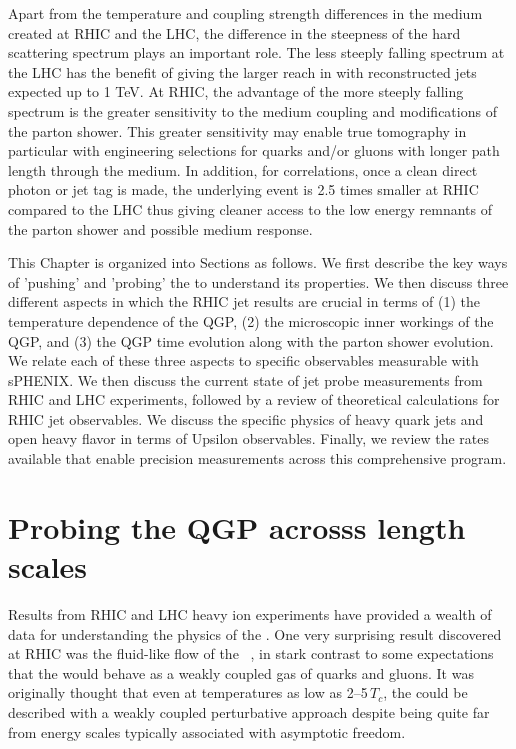 Apart from the temperature and coupling strength differences in the medium created
at RHIC and the LHC, the difference in the steepness of the hard scattering \pt spectrum
plays an important role.   The less steeply falling spectrum at the LHC has the benefit
of giving the larger reach in \pt with reconstructed jets expected up to 1 TeV.   At RHIC,
the advantage of the more steeply falling spectrum is the greater sensitivity to the medium
coupling and \qgp modifications of the parton shower.   This greater sensitivity may enable
true tomography in particular with engineering selections for quarks and/or gluons with longer
path length through the medium.   In addition, for correlations, once a clean direct photon or jet
tag is made, the underlying event is 2.5 times smaller at RHIC compared to the LHC thus giving
cleaner access to the low energy remnants of the parton shower and possible medium response.

This Chapter is organized into Sections as follows.  We first describe
the key ways of 'pushing' and 'probing' the \qgp to understand its
properties.  We then discuss three different aspects in which the RHIC
jet results are crucial in terms of (1) the temperature dependence of
the QGP, (2) the microscopic inner workings of the QGP, and (3) the
QGP time evolution along with the parton shower evolution.  We relate each
of these three aspects to specific observables measurable with sPHENIX.  We then
discuss the current state of jet probe measurements from RHIC and LHC
experiments, followed by a review of theoretical calculations for RHIC
jet observables.  We discuss the specific physics of heavy quark jets and open
heavy flavor in terms of Upsilon observables.   Finally, we review the rates available
that enable precision measurements across this comprehensive program.

\section{Probing the QGP acrosss length scales}

Results from RHIC and LHC heavy ion experiments have provided a wealth
of data for understanding the physics of the \qgp.  One very
surprising result discovered at RHIC was the fluid-like flow of the
\qgp~\cite{Adcox:2004mh}, in stark contrast to some expectations that
the \qgp would behave as a weakly coupled gas of quarks and gluons.
It was originally thought that even at temperatures as low as
2--5\,$T_{c}$, the \qgp could be described with a weakly coupled
perturbative approach despite being quite far from energy scales
typically associated with asymptotic freedom.  

